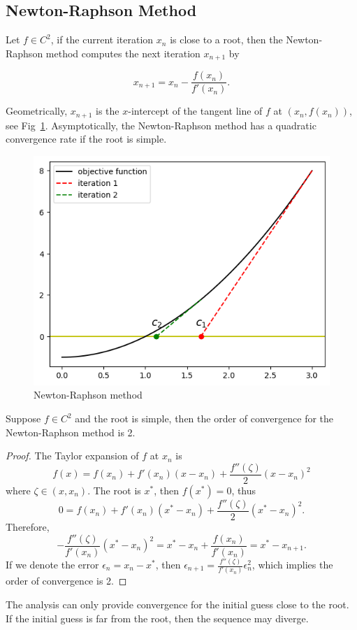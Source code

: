 \subsection{Newton-Raphson Method}
Let $f\in C^2$, if the current iteration $x_{n}$ is close to a root, then the Newton-Raphson method computes the next iteration $x_{n+1}$ by

$$
x_{n+1} = x_n - \frac{f(x_n)}{f'(x_n)}.
$$

Geometrically, $x_{n+1}$ is the $x$-intercept of the tangent line of $f$ at $(x_n, f(x_n))$, see Fig~\ref{FIG: 0-RO-FI-NE-ME}. Asymptotically, the Newton-Raphson method has a quadratic convergence rate if the root is simple.

\begin{figure}[!htb]
    \centering
    \includegraphics[scale=0.6]{Figures/root_finding_img_2.png}
    \caption{Newton-Raphson method}
    \label{FIG: 0-RO-FI-NE-ME}
\end{figure}

\begin{theorem}
Suppose $f\in C^2$ and the root is simple, then the order of convergence for the Newton-Raphson method is 2.
\end{theorem}
\begin{proof}
The Taylor expansion of $f$ at $x_n$ is
$$f(x) = f(x_n) + f'(x_n)(x - x_n) + \frac{f''(\zeta)}{2}(x - x_n)^2$$
where $\zeta\in (x, x_n)$. The root is $x^{\ast}$, then $f(x^{\ast}) = 0$, thus
$$0 = f(x_n) + f'(x_n)(x^{\ast} - x_n) + \frac{f''(\zeta)}{2}(x^{\ast} - x_n)^2.$$
Therefore,
$$
-\frac{f''(\zeta)}{f'(x_n)} (x^{\ast} - x_n)^2= x^{\ast} - x_n + \frac{f(x_n)}{f'(x_n)} = x^{\ast} - x_{n+1}.
$$
If we denote the error $\epsilon_{n} = x_n - x^{\ast}$, then $\epsilon_{n+1} = \frac{f''(\zeta)}{f'(x_n)} \epsilon_{n}^2$, which implies the order of convergence is 2.
\end{proof}
\begin{remark}
    The analysis can only provide convergence for the initial guess close to the root. If the initial guess is far from the root, then the sequence may diverge.
\end{remark}
